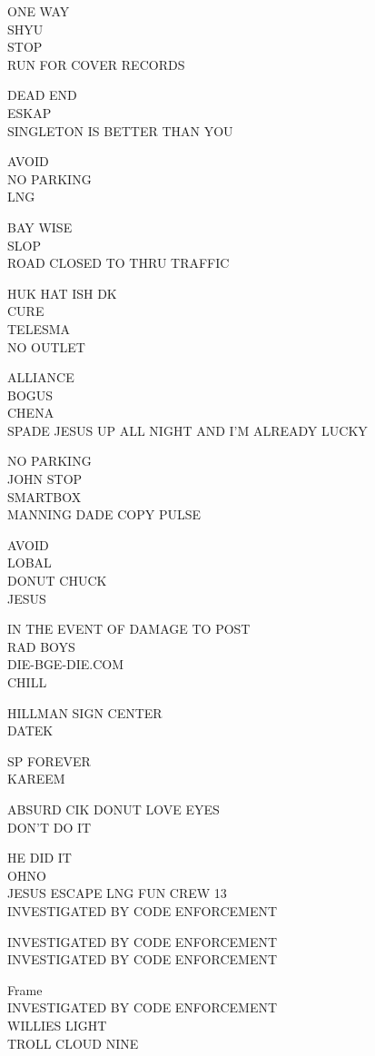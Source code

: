 \documentclass[10pt,letterpaper]{article}
\begin{document}
ONE WAY\\
SHYU\\
STOP\\
RUN FOR COVER RECORDS

DEAD END\\
ESKAP\\
SINGLETON IS BETTER THAN YOU

AVOID\\
NO PARKING\\
LNG

BAY WISE\\
SLOP\\
ROAD CLOSED TO THRU TRAFFIC

HUK HAT ISH DK\\
CURE\\
TELESMA\\
NO OUTLET

ALLIANCE\\
BOGUS\\
CHENA\\
SPADE JESUS UP ALL NIGHT AND I'M ALREADY LUCKY

NO PARKING\\
JOHN STOP\\
SMARTBOX\\
MANNING DADE COPY PULSE

AVOID\\
LOBAL\\
DONUT CHUCK\\
JESUS

IN THE EVENT OF DAMAGE TO POST\\
RAD BOYS\\
DIE{-}BGE{-}DIE.COM\\
CHILL

HILLMAN SIGN CENTER\\
DATEK

SP FOREVER\\
KAREEM

ABSURD CIK DONUT LOVE EYES\\
DON'T DO IT

HE DID IT\\
OHNO\\
JESUS ESCAPE LNG FUN CREW 13\\
INVESTIGATED BY CODE ENFORCEMENT

INVESTIGATED BY CODE ENFORCEMENT\\
INVESTIGATED BY CODE ENFORCEMENT

Frame\\
INVESTIGATED BY CODE ENFORCEMENT\\
WILLIES LIGHT\\
TROLL CLOUD NINE
\end{document}
